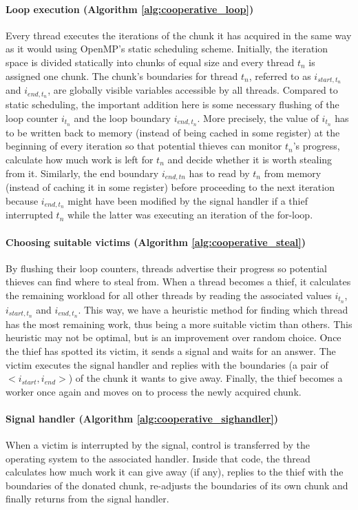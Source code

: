 \documentclass{acm_proc_article-sp}
\begin{document}
\paragraph{Loop execution (Algorithm \ref{alg:cooperative_loop})}
Every thread executes the iterations of the chunk it has acquired in the same 
way as it would using OpenMP's static scheduling scheme. Initially, the 
iteration space is divided statically into chunks of equal size and every 
thread $t_n$ is assigned one chunk. The chunk's boundaries for thread $t_n$, 
referred to as $i_{start,t_n}$ and $i_{end,t_n}$, are globally visible 
variables accessible by all threads. Compared to static scheduling, the 
important addition here is some necessary flushing of the loop counter 
$i_{t_n}$ and the loop boundary $i_{end,t_n}$. More precisely, the value of 
$i_{t_n}$ has to be written back to memory (instead of being cached in some 
register) at the beginning of every iteration so that potential thieves can 
monitor $t_n$'s progress, calculate how much work is left for $t_n$ and decide 
whether it is worth stealing from it. Similarly, the end boundary $i_{end,tn}$ 
has to read by $t_n$ from memory (instead of caching it in some register) 
before proceeding to the next iteration because $i_{end,t_n}$ might have been 
modified by the signal handler if a thief interrupted $t_n$ while the latter 
was executing an iteration of the for-loop.

\paragraph{Choosing suitable victims (Algorithm \ref{alg:cooperative_steal})}
By flushing their loop counters, threads advertise their progress so potential 
thieves can find where to steal from. When a thread becomes a thief, it 
calculates the remaining workload for all other threads by reading the 
associated values $i_{t_n}$, $i_{start,t_n}$ and $i_{end,t_n}$. This way, we 
have a heuristic method for finding which thread has the most remaining work, 
thus being a more suitable victim than others. This heuristic may not be 
optimal, but is an improvement over random choice. Once the thief has spotted 
its victim, it sends a signal and waits for an answer. The victim executes the 
signal handler and replies with the boundaries (a pair of $<i_{start}, 
i_{end}>$) of the chunk it wants to give away. Finally, the thief becomes a 
worker once again and moves on to process the newly acquired chunk.

\paragraph{Signal handler (Algorithm \ref{alg:cooperative_sighandler})}
When a victim is interrupted by the signal, control is transferred by the 
operating system to the associated handler. Inside that code, the thread 
calculates how much work it can give away (if any), replies to the thief with 
the boundaries of the donated chunk, re-adjusts the boundaries of its own chunk 
and finally returns from the signal handler.
\end{document}
